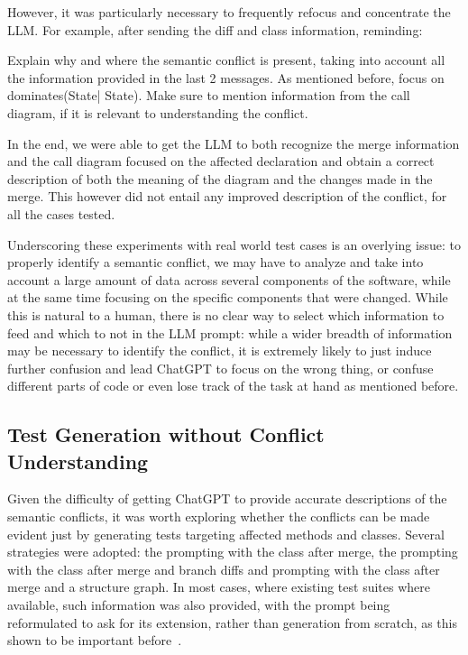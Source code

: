 However, it was particularly necessary to frequently refocus and concentrate the LLM. For example, after sending the diff and class information, reminding:

\begin{prompt}
Explain why and where the semantic conflict is present, taking into account all the information provided in the last 2 messages. As mentioned before, focus on dominates(State| State). Make sure to mention information from the call diagram, if it is relevant to understanding the conflict.
\end{prompt}

In the end, we were able to get the LLM to both recognize the merge information and the call diagram focused on the affected declaration and obtain a correct description of both the meaning of the diagram and the changes made in the merge. This however did not entail any improved description of the conflict, for all the cases tested.

Underscoring these experiments with real world test cases is an overlying issue: to properly identify a semantic conflict, we may have to analyze and take into account a large amount of data across several components of the software, while at the same time focusing on the specific components that were changed. While this is natural to a human, there is no clear way to select which information to feed and which to not in the LLM prompt: while a wider breadth of information may be necessary to identify the conflict, it is extremely likely to just induce further confusion and lead ChatGPT to focus on the wrong thing, or confuse different parts of code or even lose track of the task at hand as mentioned before.

\subsection{Test Generation without Conflict Understanding}

Given the difficulty of getting ChatGPT to provide accurate descriptions of the semantic conflicts, it was worth exploring whether the conflicts can be made evident just by generating tests targeting affected methods and classes. Several strategies were adopted: the prompting with the class after merge, the prompting with the class after merge and branch diffs and prompting with the class after merge and a structure graph. In most cases, where existing test suites where available, such information was also provided, with the prompt being reformulated to ask for its extension, rather than generation from scratch, as this shown to be important before~\cite{kn:githubcopilot}.

